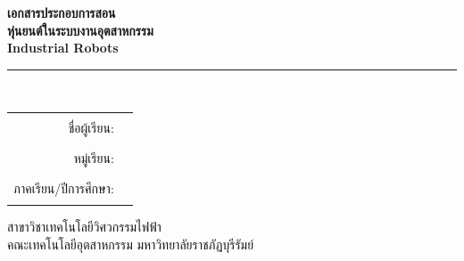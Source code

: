 \documentclass[16pt,a4paper]{extarticle}
\begin{document}
\begin{titlepage}
\begin{center}
    \vspace*{1.2cm}
    {\Huge\bfseries เอกสารประกอบการสอน}\\[1.0em]
    {\LARGE\bfseries หุ่นยนต์ในระบบงานอุตสาหกรรม}\\[1.0em]
    {\Large\bfseries Industrial Robots}\\[1.5em]
    \rule{0.82\textwidth}{0.8pt}\\[1.2em]
   

    \vfill

    \begin{tabular}{rl}
        ชื่อผู้เรียน: & \rule{9cm}{0.4pt} \\[1em]
        หมู่เรียน: & \rule{9cm}{0.4pt} \\[1em]
        ภาคเรียน/ปีการศึกษา: & \rule{9cm}{0.4pt}
    \end{tabular}

    \vfill
    {\large สาขาวิชาเทคโนโลยีวิศวกรรมไฟฟ้า}\\[0.25em]
    {\large คณะเทคโนโลยีอุตสาหกรรม มหาวิทยาลัยราชภัฏบุรีรัมย์}
\end{center}
\end{titlepage}

\tableofcontents
\clearpage
{}



\end{document}
